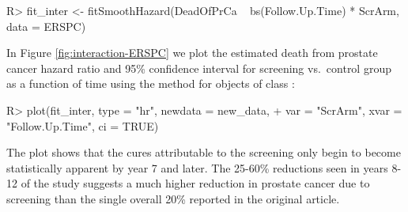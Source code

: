 \documentclass[
]{jss}
\begin{document}
\begin{CodeChunk}

\begin{CodeInput}
R> fit_inter <- fitSmoothHazard(DeadOfPrCa ~ bs(Follow.Up.Time) * ScrArm, data = ERSPC)
\end{CodeInput}
\end{CodeChunk}

In Figure \ref{fig:interaction-ERSPC} we plot the estimated death from
prostate cancer hazard ratio and 95\% confidence interval for screening
vs.~control group as a function of time using the  method for
objects of class :

\begin{CodeChunk}

\begin{CodeInput}
R> plot(fit_inter, type = "hr", newdata = new_data,
+      var = "ScrArm", xvar = "Follow.Up.Time", ci = TRUE)
\end{CodeInput}
\end{CodeChunk}

The plot shows that the cures attributable to the screening only begin
to become statistically apparent by year 7 and later. The 25-60\%
reductions seen in years 8-12 of the study suggests a much higher
reduction in prostate cancer due to screening than the single overall
20\% reported in the original article.
\end{document}
